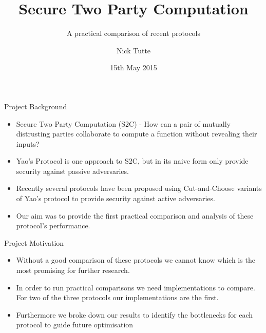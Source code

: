 \documentclass[t, 12pt]{beamer}            %
\title[Secure Two Party Computation]{Secure Two Party Computation}
\subtitle{A practical comparison of recent protocols}
\author{Nick Tutte}
\institute{University of Bristol}
\date{15th May 2015}
\begin{document}
\titlepage


\begin{frame}{Project Background}
	\begin{itemize} %
		\item Secure Two Party Computation (S2C) - How can a pair of mutually distrusting parties collaborate to compute a function without revealing their inputs?
		\item Yao's Protocol is one approach to S2C, but in its naive form only provide security against passive adversaries.
		\item Recently several protocols have been proposed using Cut-and-Choose variants of Yao's protocol to provide security against active adversaries.
		\item Our aim was to provide the first practical comparison and analysis of these protocol's performance.
	\end{itemize}
\end{frame}


\begin{frame}{Project Motivation}
	\begin{itemize} %
		\item Without a good comparison of these protocols we cannot know which is the most promising for further research.
		\item In order to run practical comparisons we need implementations to compare. For two of the three protocols our implementations are the first.
		\item Furthermore we broke down our results to identify the bottlenecks for each protocol to guide future optimisation
	\end{itemize}
\end{frame}


\end{document}

